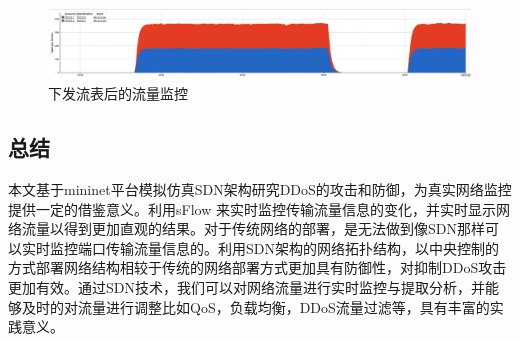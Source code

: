 \begin{figure}[H]
	\centering
	\includegraphics[width=0.9\linewidth]{pics/screenshot00122}
	\caption{下发流表后的流量监控}
	\label{fig:screenshot00122}
\end{figure}

\begin{multicols}{2}
\section{总结}
本文基于mininet平台模拟仿真SDN架构研究DDoS的攻击和防御，为真实网络监控提供一定的借鉴意义。利用sFlow 来实时监控传输流量信息的变化，并实时显示网络流量以得到更加直观的结果。对于传统网络的部署，是无法做到像SDN那样可以实时监控端口传输流量信息的。利用SDN架构的网络拓扑结构，以中央控制的方式部署网络结构相较于传统的网络部署方式更加具有防御性，对抑制DDoS攻击更加有效。通过SDN技术，我们可以对网络流量进行实时监控与提取分析，并能够及时的对流量进行调整比如QoS，负载均衡，DDoS流量过滤等，具有丰富的实践意义。
\end{multicols}




















